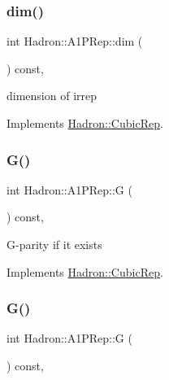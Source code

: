 \subsubsection{\texorpdfstring{dim()}{dim()}\hspace{0.1cm}{\footnotesize\ttfamily [3/3]}}
{\footnotesize\ttfamily int Hadron\+::\+A1\+P\+Rep\+::dim (\begin{DoxyParamCaption}{ }\end{DoxyParamCaption}) const\hspace{0.3cm}{\ttfamily [inline]}, {\ttfamily [virtual]}}

dimension of irrep 

Implements \mbox{\hyperlink{structHadron_1_1CubicRep_ac178d14064f037a66af4b9fb4b312d51}{Hadron\+::\+Cubic\+Rep}}.

\mbox{\label{structHadron_1_1A1PRep_ab530e4430b28d16940ad3c922b253c70}} 
\subsubsection{\texorpdfstring{G()}{G()}\hspace{0.1cm}{\footnotesize\ttfamily [1/3]}}
{\footnotesize\ttfamily int Hadron\+::\+A1\+P\+Rep\+::G (\begin{DoxyParamCaption}{ }\end{DoxyParamCaption}) const\hspace{0.3cm}{\ttfamily [inline]}, {\ttfamily [virtual]}}

G-\/parity if it exists 

Implements \mbox{\hyperlink{structHadron_1_1CubicRep_a52104e43266d1614c00bbd1c3b395458}{Hadron\+::\+Cubic\+Rep}}.

\mbox{\label{structHadron_1_1A1PRep_ab530e4430b28d16940ad3c922b253c70}} 
\subsubsection{\texorpdfstring{G()}{G()}\hspace{0.1cm}{\footnotesize\ttfamily [2/3]}}
{\footnotesize\ttfamily int Hadron\+::\+A1\+P\+Rep\+::G (\begin{DoxyParamCaption}{ }\end{DoxyParamCaption}) const\hspace{0.3cm}{\ttfamily [inline]}, {\ttfamily [virtual]}}

